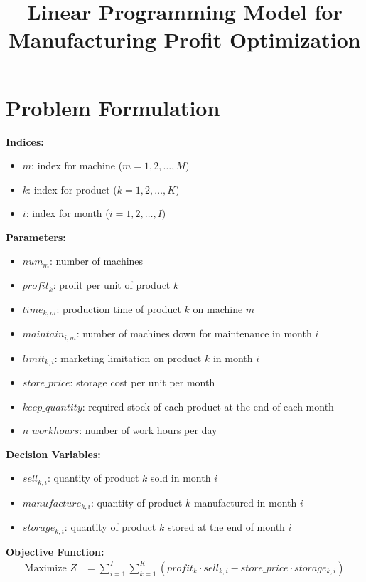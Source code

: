 \documentclass{article}
\begin{document}
\title{Linear Programming Model for Manufacturing Profit Optimization}
\author{}
\date{}
\maketitle

\section*{Problem Formulation}

\textbf{Indices:}
\begin{itemize}
    \item $m$: index for machine ($m = 1, 2, \ldots, M$)
    \item $k$: index for product ($k = 1, 2, \ldots, K$)
    \item $i$: index for month ($i = 1, 2, \ldots, I$)
\end{itemize}

\textbf{Parameters:}
\begin{itemize}
    \item $num_m$: number of machines
    \item $profit_k$: profit per unit of product $k$
    \item $time_{k,m}$: production time of product $k$ on machine $m$
    \item $maintain_{i,m}$: number of machines down for maintenance in month $i$
    \item $limit_{k,i}$: marketing limitation on product $k$ in month $i$
    \item $store\_price$: storage cost per unit per month
    \item $keep\_quantity$: required stock of each product at the end of each month
    \item $n\_workhours$: number of work hours per day
\end{itemize}

\textbf{Decision Variables:}
\begin{itemize}
    \item $sell_{k,i}$: quantity of product $k$ sold in month $i$
    \item $manufacture_{k,i}$: quantity of product $k$ manufactured in month $i$
    \item $storage_{k,i}$: quantity of product $k$ stored at the end of month $i$
\end{itemize}

\textbf{Objective Function:}
\begin{align*}
    \text{Maximize } Z &= \sum_{i=1}^{I} \sum_{k=1}^{K} \left( profit_k \cdot sell_{k,i} - store\_price \cdot storage_{k,i} \right)
\end{align*}
\end{document}
